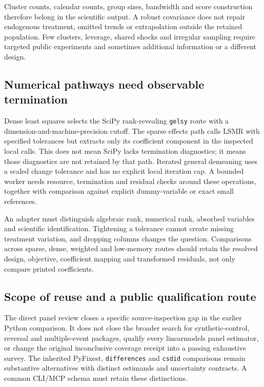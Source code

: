Cluster counts, calendar counts, group sizes, bandwidth and score construction
therefore belong in the scientific output. A robust covariance does not
repair endogenous treatment, omitted trends or extrapolation outside the
retained population. Few clusters, leverage, shared shocks and irregular
sampling require targeted public experiments and sometimes additional
information or a different design.\citep{exec24_lmpanel_reference}

\subsection{Numerical pathways need observable termination}
Dense least squares selects the SciPy rank-revealing \texttt{gelsy} route
with a dimension-and-machine-precision cutoff. The sparse effects path
calls LSMR with specified tolerances but extracts only its coefficient
component in the inspected local calls. This does not mean SciPy lacks
termination diagnostics; it means those diagnostics are not retained by
that path. Iterated general demeaning uses a scaled change tolerance and
has no explicit local iteration cap. A bounded worker needs resource,
termination and residual checks around these operations, together with
comparison against explicit dummy-variable or exact small references.
\citep{exec24_lmpanel_source}

An adapter must distinguish algebraic rank, numerical rank, absorbed
variables and scientific identification. Tightening a tolerance cannot
create missing treatment variation, and dropping columns changes the
question. Comparisons across sparse, dense, weighted and low-memory routes
should retain the resolved design, objective, coefficient mapping and
transformed residuals, not only compare printed coefficients.
\citep{exec24_lmpanel_reference}

\subsection{Scope of reuse and a public qualification route}
The direct panel review closes a specific source-inspection gap in the
earlier Python comparison. It does not close the broader search for
synthetic-control, reversal and multiple-event packages, qualify every
linearmodels panel estimator, or change the original inconclusive coverage
receipt into a passing exhaustive survey. The inherited PyFixest,
\texttt{differences} and \texttt{csdid} comparisons remain substantive
alternatives with distinct estimands and uncertainty contracts. A common
CLI/MCP schema must retain these distinctions.
\citep{exec24_lmpanel_reference}

